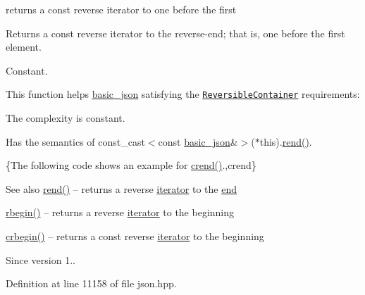 returns a const reverse iterator to one before the first 

Returns a const reverse iterator to the reverse-\/end; that is, one before the first element.

  Constant.

This function helps {\ttfamily \hyperlink{classnlohmann_1_1basic__json}{basic\+\_\+json}} satisfying the \href{http://en.cppreference.com/w/cpp/concept/ReversibleContainer}{\tt Reversible\+Container} requirements\+:
\begin{DoxyItemize}
\item The complexity is constant.
\item Has the semantics of {\ttfamily const\+\_\+cast$<$const \hyperlink{classnlohmann_1_1basic__json}{basic\+\_\+json}\&$>$($\ast$this).\hyperlink{classnlohmann_1_1basic__json_ac77aed0925d447744676725ab0b6d535}{rend()}}.
\end{DoxyItemize}

\{The following code shows an example for {\ttfamily \hyperlink{classnlohmann_1_1basic__json_a5795b029dbf28e0cb2c7a439ec5d0a88}{crend()}}.,crend\}

\begin{DoxySeeAlso}{See also}
\hyperlink{classnlohmann_1_1basic__json_ac77aed0925d447744676725ab0b6d535}{rend()} -- returns a reverse \hyperlink{classnlohmann_1_1basic__json_a099316232c76c034030a38faa6e34dca}{iterator} to the \hyperlink{classnlohmann_1_1basic__json_a13e032a02a7fd8a93fdddc2fcbc4763c}{end} 

\hyperlink{classnlohmann_1_1basic__json_a1ef93e2006dbe52667294f5ef38b0b10}{rbegin()} -- returns a reverse \hyperlink{classnlohmann_1_1basic__json_a099316232c76c034030a38faa6e34dca}{iterator} to the beginning 

\hyperlink{classnlohmann_1_1basic__json_a1e0769d22d54573f294da0e5c6abc9de}{crbegin()} -- returns a const reverse \hyperlink{classnlohmann_1_1basic__json_a099316232c76c034030a38faa6e34dca}{iterator} to the beginning
\end{DoxySeeAlso}
\begin{DoxySince}{Since}
version 1.. 
\end{DoxySince}


Definition at line 11158 of file json.\+hpp.

